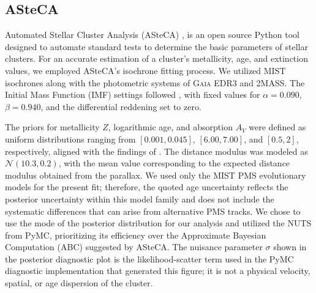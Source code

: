 \documentclass{aa}
\begin{document}
\subsection{ASteCA}
Automated Stellar Cluster Analysis (ASteCA) \citep{2015A&A...576A...6P}, is an open source Python tool designed to automate standard tests to determine the basic parameters of stellar clusters. For an accurate estimation of a cluster's metallicity, age, and extinction values, we employed ASteCA's isochrone fitting process. We utilized \textsc{MIST} isochrones \citep{2016ApJS..222....8D, 2016ApJ...823..102C} along with the photometric systems of \textsc{Gaia} EDR3 and \textsc{2MASS}. The Initial Mass Function (IMF) settings followed \citet{2014ApJ...796...75C}, with fixed values for $\alpha = 0.090$, $\beta = 0.940$, and the differential reddening set to zero.

The priors for metallicity $Z$, logarithmic age, and absorption $A_V$ were defined as uniform distributions ranging from $[0.001, 0.045]$, $[6.00, 7.00]$, and $[0.5, 2]$, respectively, aligned with the findings of \cite{2024arXiv240301030P}. The distance modulus was modeled as $\mathcal{N}(10.3, 0.2)$, with the mean value corresponding to the expected distance modulus obtained from the parallax. We used only the \textsc{MIST} PMS evolutionary models for the present fit; therefore, the quoted age uncertainty reflects the posterior uncertainty within this model family and does not include the systematic differences that can arise from alternative PMS tracks. We chose to use the mode of the posterior distribution for our analysis and utilized the NUTS from PyMC, prioritizing its efficiency over the Approximate Bayesian Computation (ABC) suggested by ASteCA. The nuisance parameter $\sigma$ shown in the posterior diagnostic plot is the likelihood-scatter term used in the PyMC diagnostic implementation that generated this figure; it is not a physical velocity, spatial, or age dispersion of the cluster.
\end{document}

